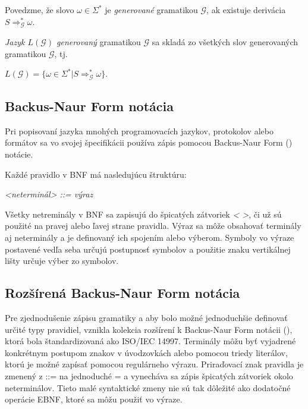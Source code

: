 \begin{definice}
Povedzme, že slovo $\omega \in \Sigma^*$ je \textit{generované} gramatikou $\mathcal{G}$, ak existuje derivácia $S\Rightarrow_\mathcal{G}^*\omega$.

\textit{Jazyk $L(\mathcal{G})$ generovaný} gramatikou $\mathcal{G}$ sa skladá zo všetkých slov generovaných gramatikou $\mathcal{G}$, tj.
\begin{center}
$L(\mathcal{G}) = \{\omega \in \Sigma^* | S \Rightarrow_\mathcal{G}^* \omega\}$.\cite{demlova:gramatiky}
\end{center}
\end{definice}

\subsection{Backus-Naur Form notácia}\label{BNF}
Pri popisovaní jazyka mnohých programovacích jazykov, protokolov alebo formátov sa vo svojej špecifikácii používa zápis pomocou Backus-Naur Form () notácie.\cite{might:languages} 

Každé pravidlo v BNF má nasledujúcu štruktúru:
\begin{center}
\textit{<neterminál> ::= výraz}
\end{center}

Všetky netreminály v BNF sa zapisujú do špicatých zátvoriek \textit{< >}, či už sú použité na pravej alebo ľavej strane pravidla. Výraz sa môže obsahovať terminály aj neterminály a je definovaný ich spojením alebo výberom. Symboly vo výraze postavené vedľa seba určujú postupnosť symbolov a použitie znaku vertikálnej lišty určuje výber zo symbolov.

\subsection{Rozšírená Backus-Naur Form notácia}\label{EBNF}
Pre zjednodušenie zápisu gramatiky a aby bolo možné jednoduchšie definovať určité typy pravidiel, vznikla kolekcia rozšírení k Backus-Naur Form notácii (), ktorá bola štandardizovaná ako ISO/IEC 14997\cite{ISO14977}. Terminály môžu byť vyjadrené konkrétnym postupom znakov v úvodzovkách alebo pomocou triedy literálov, ktorú je možné zapísať pomocou regulárneho výrazu. Priraďovací znak pravidla je zmenený z ::= na jednoduché = a vynecháva sa zápis špicatých zátvoriek okolo neterminálov. Tieto malé syntaktické zmeny nie sú tak dôležité ako dodatočné operácie EBNF, ktoré sa môžu použiť vo výraze.

